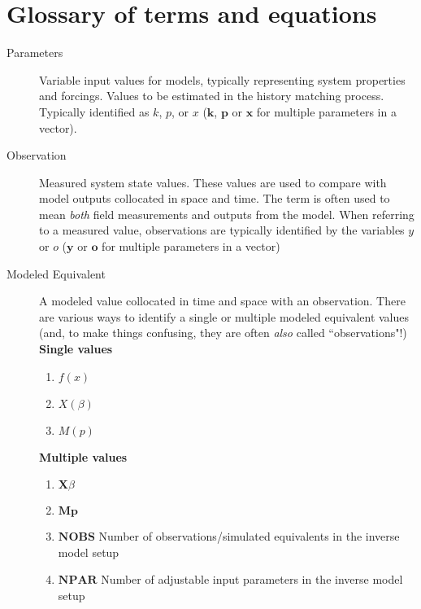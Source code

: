 \documentclass[english]{article}
\begin{document}
\section*{Glossary of terms and equations}
\begin{description}
\item [Parameters] Variable input values for models, typically representing system properties and forcings. Values to be estimated in the history matching process. Typically identified as $k$, $p$, or $x$ ($\mathbf{k}$, $\mathbf{p}$ or $\mathbf{x}$ for multiple parameters in a vector).
\item [Observation] Measured system state values. These values are used to compare with model outputs collocated in space and time. The term is often used to mean \emph{both} field measurements and outputs from the model. When referring to a measured value, observations are typically identified by the variables $y$ or $o$  ($\mathbf{y}$ or $\mathbf{o}$ for multiple parameters in a vector)
\item [Modeled Equivalent] A modeled value collocated in time and space with an observation. There are various ways to identify a single or multiple modeled equivalent values (and, to make things confusing, they are often \emph{also} called ``observations"!)  \newline{}
\textbf{Single values} 
\begin{enumerate}
\item $f\left(x\right)$
\item $X\left(\beta\right)$
\item $M\left(p\right)$
\end{enumerate}
\textbf{Multiple values}
\begin{enumerate}
\item $\mathbf{X}\beta$
\item $\mathbf{M}\mathbf{p}$
\item $\mathbf{NOBS}$ Number of observations/simulated equivalents in the inverse model setup
\item $\mathbf{NPAR}$ Number of adjustable input parameters in the inverse model setup


\end{enumerate}
\end{description}
\end{document}
